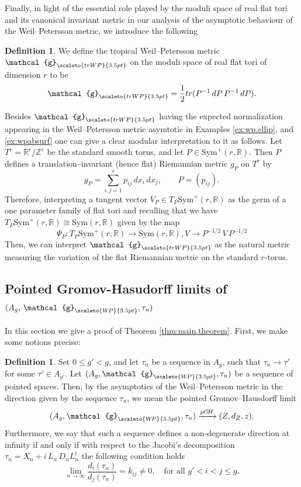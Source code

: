 \documentclass[11pt]{amsart}
\theoremstyle{plain}
\theoremstyle{definition}
\newtheorem{definition}[theorem]{Definition}
\theoremstyle{remark}
\newcommand{\R}{\mathbb R}
\newcommand{\Z}{\mathbb{Z}}
\newcommand{\g}{\mathcal{g}}
\newcommand{\sym}{\mathrm{Sym}^{\!+}}
\newcommand{\WP}{\scaleto{W\!P}{3.5pt}}
\newcommand{\trWP}{\scaleto{trWP}{3.5pt}}
\begin{document}
Finally, in light of the essential role played by the moduli space of real flat tori and its canonical invariant metric in our analysis of the asymptotic behaviour of the Weil--Petersson metric, we introduce the following
\begin{definition}
    \label{def:trop.wp}
    We define the tropical Weil--Petersson metric $\g_{\trWP}$ on the moduli space of real flat tori of dimension $r$ to be
    \begin{equation}
        \label{eq:trop.wp}
        \g_{\trWP}=\frac{1}{2}tr(P^{-1}\,dP\,P^{-1}\,dP).
    \end{equation}
\end{definition}

Besides $\g_{\trWP}$ having the expected normalization appearing in the Weil--Petersson metric asymtotic in Examples \ref{ex:wp.ellip}, and \ref{ex:wpabsurf} one can give a clear modular interpretation to it as follows. Let $T^r=\R^r/\Z^r$ be the standard smooth torus, and let $P\in\sym(r,\R)$. Then $P$ defines a translation--invariant (hence flat) Riemannian metric $g_P$ on $T^r$ by
\[
g_P=\sum_{i,j=1}^r p_{ij}\,dx_i\,dx_j,\qquad P=(p_{ij}).
\]
Therefore, interpreting a tangent vector $V_P\in T_P\sym(r,\R)$ as the germ of a one parameter family of flat tori and recalling that we have $T_P\sym(r,\R)\cong\mathrm{Sym}(r,\R)$ given by the map 
\[
\Psi_P: T_P\sym(r,\R)\to \mathrm{Sym}(r,\R), V\to P^{-1/2}\,V\,P^{-1/2}
\]
Then, we can interpret $\g_{\trWP}$ as the natural metric measuring the variation of the flat Riemannian metric on the standard $r$-torus.

\subsection{Pointed Gromov-Hasudorff limits of \texorpdfstring{$(A_g,\,\g_{\WP},\tau_n)$}.}
In this section we give a proof of Theorem \ref{thm:main.theorem}. First, we make some notions precise:
\begin{definition}\label{def:non.deg.direc.Ag}
    Set $0\leq g'<g$, and let $\tau_n$ be a sequence in $A_g$, such that $\tau_n\to\tau'$ for some $\tau'\in A_{g'}$. Let $(A_g,\g_{\WP},\tau_n)$ be a sequence of pointed spaces. Then, by the asymptotics of the Weil--Petersson metric in the direction given by the sequence $\tau_n$, we mean the pointed Gromov--Hausdorff limit 
    \[
    (A_g,\g_{\WP},\tau_n)\xrightarrow[]{pG\!H}(Z,d_Z,z).
    \]
    Furthermore, we say that such a sequence defines a non-degenerate direction at infinity if and only if with respect to the Jacobi's decomposition $\tau_n=X_n + i \,L_n\,D_nL_n^t$ the following condition holds
    \begin{equation}
        \lim_{n\to \infty} \frac{d_i(\tau_n)}{d_j(\tau_n)}=k_{ij}\neq 0,\quad \text{for all}\,\, g'<i<j\leq g. 
    \end{equation}
\end{definition}
\end{document}
